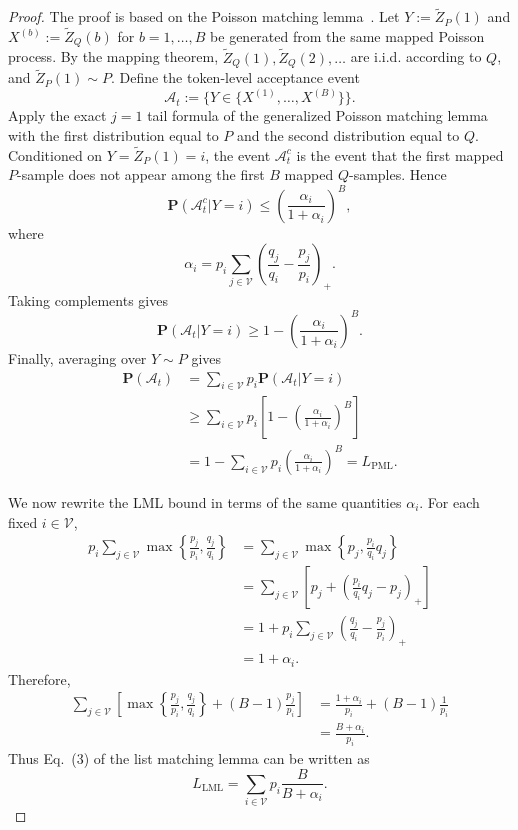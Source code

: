 \documentclass{article}
\theoremstyle{plain}
\theoremstyle{definition}
\begin{document}
\begin{proof}
The proof is based on the Poisson matching lemma~\citep{li2021unified}.
Let $Y:=\tilde Z_P(1)$ and $X^{(b)}:=\tilde Z_Q(b)$ for
$b=1,\ldots,B$ be generated from the same mapped Poisson process. By the
mapping theorem, $\tilde Z_Q(1),\tilde Z_Q(2),\ldots$ are i.i.d. according
to $Q$, and $\tilde Z_P(1)\sim P$. Define the token-level acceptance event
\[
    \mathcal A_t
    :=
    \Big\{
        Y\in\{X^{(1)},\ldots,X^{(B)}\}
    \Big\}.
\]
Apply the exact $j=1$ tail formula of the generalized Poisson matching lemma
with the first distribution equal to $P$ and the second distribution equal to
$Q$. Conditioned on $Y=\tilde Z_P(1)=i$, the event $\mathcal A_t^c$ is the
event that the first mapped $P$-sample does not appear among the first $B$
mapped $Q$-samples. Hence
\[
    \mathbf{P}(\mathcal A_t^c| Y=i)
    \le
    \left(
        \frac{\alpha_i}{1+\alpha_i}
    \right)^B,
\]
where
\[
    \alpha_i
    =
    p_i\sum_{j\in\mathcal V}
    \left(
        \frac{q_j}{q_i}-\frac{p_j}{p_i}
    \right)_+ .
\]
Taking complements gives
\[
    \mathbf{P}(\mathcal A_t| Y=i)
    \ge
    1-
    \left(
        \frac{\alpha_i}{1+\alpha_i}
    \right)^B .
\]
Finally, averaging over $Y\sim P$ gives
\[
\begin{aligned}
    \mathbf{P}(\mathcal A_t)
    &=
    \sum_{i\in\mathcal V}
    p_i\mathbf{P}(\mathcal A_t| Y=i)\\
    &\ge
    \sum_{i\in\mathcal V}
    p_i
    \left[
        1-
        \left(
            \frac{\alpha_i}{1+\alpha_i}
        \right)^B
    \right]\\
    &=
    1-\sum_{i\in\mathcal V}
    p_i
    \left(
        \frac{\alpha_i}{1+\alpha_i}
    \right)^B
    =
    L_{\mathrm{PML}}.
\end{aligned}
\]

We now rewrite the LML bound in terms of the same quantities $\alpha_i$.
For each fixed $i\in\mathcal V$,
\begin{align*}
    p_i
    \sum_{j\in\mathcal V}
    \max\left\{
        \frac{p_j}{p_i},
        \frac{q_j}{q_i}
    \right\}
    &=
    \sum_{j\in\mathcal V}
    \max\left\{
        p_j,
        \frac{p_i}{q_i}q_j
    \right\} \\
    &=
    \sum_{j\in\mathcal V}
    \left[
        p_j+
        \left(
            \frac{p_i}{q_i}q_j-p_j
        \right)_+
    \right] \\
    &=
    1+
    p_i\sum_{j\in\mathcal V}
    \left(
        \frac{q_j}{q_i}-\frac{p_j}{p_i}
    \right)_+ \\
    &=
    1+\alpha_i.
\end{align*}
Therefore,
\begin{align*}
    \sum_{j\in\mathcal V}
    \left[
        \max\left\{
            \frac{p_j}{p_i},
            \frac{q_j}{q_i}
        \right\}
        +(B-1)\frac{p_j}{p_i}
    \right]
    &=
    \frac{1+\alpha_i}{p_i}
    +(B-1)\frac{1}{p_i} \\
    &=
    \frac{B+\alpha_i}{p_i}.
\end{align*}
Thus Eq.~(3) of the list matching lemma can be written as
\[
    L_{\mathrm{LML}}
    =
    \sum_{i\in\mathcal V}
    p_i\frac{B}{B+\alpha_i}.
\]


\end{proof}
\end{document}
